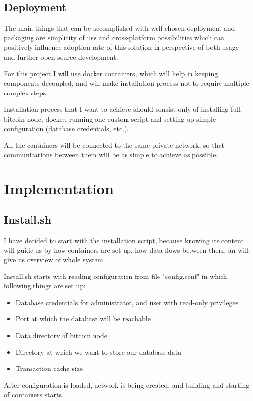 \documentclass[12pt, en, eng, oneside]{mgr}
\begin{document}
\section{Deployment}

The main things that can be accomplished with well chosen deployment and packaging are simplicity of use and cross-platform possibilities which can positively influence adoption rate of this solution in perspective of both usage and further open source development.

For this project I will use docker containers, which will help in keeping components decoupled, and will make installation process not to require multiple complex steps. 

Installation process that I want to achieve should consist only of installing full bitcoin node, docker, running one custom script and setting up simple configuration (database credentials, etc.).

All the containers will be connected to the same private network, so that communications between them will be as simple to achieve as possible.

\chapter{Implementation}

\section{Install.sh}
I have decided to start with the installation script, because knowing its content will guide us by how containers are set up, how data flows between them, an will give us overview of whole system.

Install.sh starts with reading configuration from file "config.conf" in which following things are set up:

\begin{itemize}
\item
Database credentials for administrator, and user with read-only privileges
\item
Port at which the database will be reachable
\item
Data directory of bitcoin node
\item
Directory at which we want to store our database data
\item
Transaction cache size
\end{itemize} 

After configuration is loaded, network is being created, and building and starting of containers starts.
\end{document}
